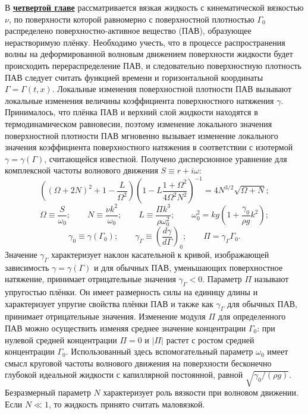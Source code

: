 В \underline{\textbf{четвертой главе}} рассматривается вязкая жидкость с кинематической вязкостью $ \nu $, по поверхности которой равномерно с поверхностной плотностью $ \Gamma_{0} $ распределено поверхностно-активное вещество (ПАВ), образующее нерастворимую плёнку. Необходимо учесть, что в процессе распространения волны на деформированной волновым движением поверхности жидкости будет происходить перераспределение ПАВ, и следовательно поверхностную плотность ПАВ следует считать функцией времени и горизонтальной координаты $ \Gamma=\Gamma \left( t, x \right) $. Локальные изменения поверхностной плотности ПАВ вызывают локальные изменения величины коэффициента поверхностного натяжения $ \gamma $. Принималось, что плёнка ПАВ и верхний слой жидкости находятся в термодинамическом равновесии, поэтому изменение локального значения поверхностной плотности ПАВ мгновенно вызывает изменение локального значения коэффициента поверхностного натяжения в соответствии с изотермой $ \gamma = \gamma \left( \Gamma \right) $, считающейся известной. Получено дисперсионное уравнение для комплексной частоты волнового движения $ S\equiv r+i\omega $:
\begin{equation}
\left( \left( \Omega +2N \right)^{2} +1-\dfrac{L}{\Omega^{2}} \right) \left( 1-L \dfrac{1+\Omega^{2}}{4 \Omega^{2} N^{2}}\right)^{-1}=4N^{3/2} \sqrt{\Omega +N};
\label{DispUrPAV}
\end{equation}
\begin{equation*}
\Omega \equiv \dfrac{S}{\omega_{0}}; \qquad N \equiv \dfrac{\nu k^{2}}{\omega_{0}}; \qquad L \equiv \dfrac{\Pi k^{3}}{\rho \omega_{0}^{2}}; \qquad \omega_{0}^{2}=k g \left( 1+\dfrac{\gamma_{0}}{\rho g}k^{2}\right);
\end{equation*}
\begin{equation*}
\gamma_{0} \equiv \gamma \left( \Gamma_{0} \right);\qquad \gamma_{\Gamma} \equiv \left(\dfrac{d \gamma}{d \Gamma} \right)_{0}; \qquad \Pi = \gamma_{\Gamma} \Gamma_{0}.
\end{equation*}
 Значение $ \gamma_{\Gamma} $ характеризует наклон касательной к кривой, изображающей зависимость $ \gamma = \gamma \left( \Gamma \right) $ и для обычных ПАВ, уменьшающих поверхностное натяжение, принимает отрицательные значения $ \gamma_{\Gamma}<0 $. Параметр $ \Pi $ называют упругостью плёнки. Он имеет размерность силы на единицу длины и характеризует упругие свойства плёнки ПАВ и также как $ \gamma_{\Gamma} $ для обычных ПАВ, принимает отрицательные значения. Изменение модуля $ \Pi $ для определенного ПАВ можно осуществить изменяя среднее значение концентрации $ \Gamma_{0} $: при нулевой средней концентрации $ \Pi=0 $ и $ \vert \Pi \vert $ растет с ростом средней концентрации $ \Gamma_{0} $. Использованный здесь вспомогательный параметр $ \omega_{0} $ имеет смысл круговой частоты волнового движения на поверхности бесконечно глубокой идеальной жидкости с капиллярной постоянной, равной $ \sqrt{\gamma_{0}/\left( \rho g \right)} $. Безразмерный параметр $ N $ характеризует роль вязкости при волновом движении. Если $ N\ll 1 $, то жидкость принято считать маловязкой.


